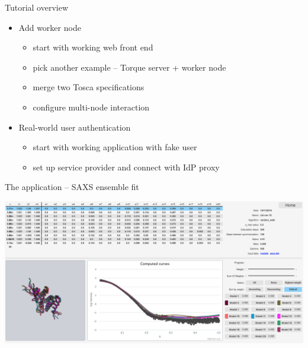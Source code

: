 \documentclass[smaller,t]{beamer}
\begin{document}
\begin{frame}{Tutorial overview}
\begin{itemize}
\item Add worker node
\begin{itemize}
\item start with working web front end
\item pick another example -- Torque server + worker node
\item \alert{merge two Tosca specifications}
\item \alert{configure multi-node interaction}
\end{itemize}
\item Real-world user authentication
\begin{itemize}
\item start with working application with fake user
\item \alert{set up service provider and connect with IdP proxy}
\end{itemize}
\end{itemize}
\end{frame}


\begin{frame}{The application -- SAXS ensemble fit}
\begin{center}
\includegraphics[width=.95\hsize]{saxs_cid}
\end{center}
\end{frame}
\end{document}
